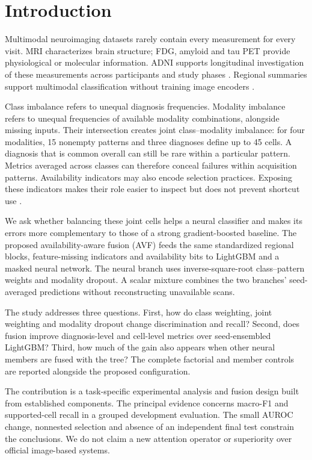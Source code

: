 \section{Introduction}
Multimodal neuroimaging datasets rarely contain every measurement for every visit. MRI characterizes brain structure; FDG, amyloid and tau PET provide physiological or molecular information. ADNI supports longitudinal investigation of these measurements across participants and study phases \citep{weiner2015adni}. Regional summaries support multimodal classification without training image encoders \citep{zhang2011multimodal}.

Class imbalance refers to unequal diagnosis frequencies. Modality imbalance refers to unequal frequencies of available modality combinations, alongside missing inputs. Their intersection creates joint class--modality imbalance: for four modalities, 15 nonempty patterns and three diagnoses define up to 45 cells. A diagnosis that is common overall can still be rare within a particular pattern. Metrics averaged across classes can therefore conceal failures within acquisition patterns. Availability indicators may also encode selection practices. Exposing these indicators makes their role easier to inspect but does not prevent shortcut use \citep{geirhos2020shortcut}.

We ask whether balancing these joint cells helps a neural classifier and makes its errors more complementary to those of a strong gradient-boosted baseline. The proposed availability-aware fusion (AVF) feeds the same standardized regional blocks, feature-missing indicators and availability bits to LightGBM and a masked neural network. The neural branch uses inverse-square-root class--pattern weights and modality dropout. A scalar mixture combines the two branches' seed-averaged predictions without reconstructing unavailable scans.

The study addresses three questions. First, how do class weighting, joint weighting and modality dropout change discrimination and recall? Second, does fusion improve diagnosis-level and cell-level metrics over seed-ensembled LightGBM? Third, how much of the gain also appears when other neural members are fused with the tree? The complete factorial and member controls are reported alongside the proposed configuration.

The contribution is a task-specific experimental analysis and fusion design built from established components. The principal evidence concerns macro-F1 and supported-cell recall in a grouped development evaluation. The small AUROC change, nonnested selection and absence of an independent final test constrain the conclusions. We do not claim a new attention operator or superiority over official image-based systems.
